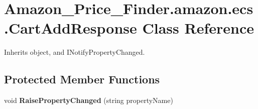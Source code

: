 \hypertarget{class_amazon___price___finder_1_1amazon_1_1ecs_1_1_cart_add_response}{\section{Amazon\-\_\-\-Price\-\_\-\-Finder.\-amazon.\-ecs.\-Cart\-Add\-Response Class Reference}
\label{class_amazon___price___finder_1_1amazon_1_1ecs_1_1_cart_add_response}
}


 




Inherits object, and I\-Notify\-Property\-Changed.

\subsection*{Protected Member Functions}
\begin{DoxyCompactItemize}
\item 
\hypertarget{class_amazon___price___finder_1_1amazon_1_1ecs_1_1_cart_add_response_a225be00ea0ee258ae2e253647890a0af}{void {\bfseries Raise\-Property\-Changed} (string property\-Name)}\label{class_amazon___price___finder_1_1amazon_1_1ecs_1_1_cart_add_response_a225be00ea0ee258ae2e253647890a0af}

\end{DoxyCompactItemize}

